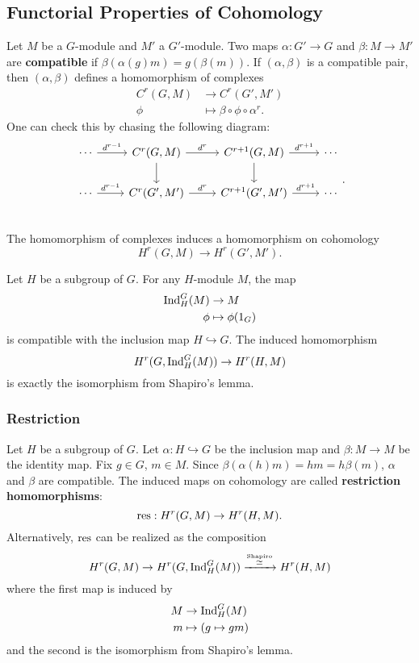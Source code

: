\subsection{Functorial Properties of Cohomology}
Let $M$ be a $G$-module and $M'$ a $G'$-module. Two maps $\alpha:G'\to G$ and $\beta:M\to M'$ are \textbf{compatible} if $\beta(\alpha(g)m)=g(\beta(m))$. If $(\alpha,\beta)$ is a compatible pair, then $(\alpha,\beta)$ defines a homomorphism of complexes
\begin{align*}
	C^{r}(G,M)&\to C^{r}(G',M')\\
	\phi&\mapsto\beta\circ\phi\circ\alpha^{r}
.\end{align*}
One can check this by chasing the following diagram:
\[
\begin{tikzcd}
	\cdots\ar{r}{d^{r-1}} & C^{r}(G,M)\ar{r}{d^{r}}\ar[d] & C^{r+1}(G,M)\ar{r}{d^{r+1}}\ar[d] & \cdots\\
	\cdots\ar{r}{d^{r-1}} & C^{r}(G',M')\ar{r}{d^{r}} & C^{r+1}(G',M')\ar{r}{d^{r+1}} & \cdots\\
\end{tikzcd}
.\]
The homomorphism of complexes induces a homomorphism on cohomology
\[
	H^{r}(G,M)\to H^{r}(G',M')
.\]
\begin{example}
Let $H$ be a subgroup of $G$. For any $H$-module $M$, the map
\begin{align*}
	\operatorname{Ind}^{G}_H(M)&\to M\\
	\phi&\mapsto \phi(1_G)
\end{align*}
is compatible with the inclusion map $H\hookrightarrow G$. The induced homomorphism
\[
	H^{r}(G,\operatorname{Ind}^{G}_H(M))\to H^{r}(H,M)
\] 
is exactly the isomorphism from Shapiro's lemma.
\end{example}

\subsubsection{Restriction} 

Let $H$ be a subgroup of $G$. Let $\alpha:H\hookrightarrow G$ be the inclusion map and $\beta:M\to M$ be the identity map. Fix $g\in G$, $m\in M$. Since $\beta(\alpha(h)m)=hm=h\beta(m)$, $\alpha$ and $\beta$ are compatible. The induced maps on cohomology are called \textbf{restriction homomorphisms}:
\[
	\operatorname{res}:H^{r}(G,M)\to H^{r}(H,M)
.\] 
Alternatively, $\operatorname{res}$ can be realized as the composition
\[
	H^{r}(G,M)\to H^{r}(G,\operatorname{Ind}^{G}_H(M))\xrightarrow{\overset{\text{Shapiro}}{\simeq}} H^{r}(H,M)
\] 
where the first map is induced by  
\begin{align*}
	M&\to\operatorname{Ind}^{G}_H(M)\\
	m&\mapsto (g\mapsto gm)
\end{align*}
and the second is the isomorphism from Shapiro's lemma.
